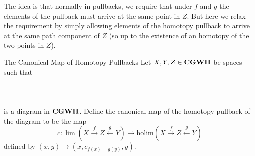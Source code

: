 \documentclass[a4paper]{article}
\begin{document}
The idea is that normally in pullbacks, we require that under $f$ and $g$ the elements of the pullback must arrive at the same point in $Z$. But here we relax the requirement by simply allowing elements of the homotopy pullback to arrive at the same path component of $Z$ (so up to the existence of an homotopy of the two points in $Z$). 

\begin{defn}{The Canonical Map of Homotopy Pullbacks}{} Let $X,Y,Z\in\bold{CGWH}$ be spaces such that \\~\\
\\~\\
is a diagram in $\bold{CGWH}$. Define the canonical map of the homotopy pullback of the diagram to be the map $$c:\lim(X\overset{f}{\rightarrow}Z\overset{g}{\leftarrow}Y)\to\text{holim}(X\overset{f}{\rightarrow}Z\overset{g}{\leftarrow}Y)$$ defined by $(x,y)\mapsto(x,c_{f(x)=g(y)},y)$. 
\end{defn}
\end{document}
